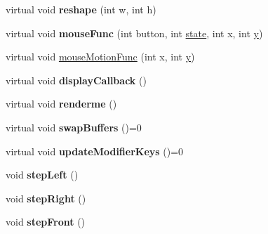 \begin{DoxyCompactItemize}
\item 
\hypertarget{class_demo_application_acbcb562288f145763585f713425da762}{virtual void {\bfseries reshape} (int w, int h)}\label{class_demo_application_acbcb562288f145763585f713425da762}

\item 
\hypertarget{class_demo_application_a634946e98868ec5463e0e906cf88119c}{virtual void {\bfseries mouse\+Func} (int button, int \hyperlink{structstate}{state}, int x, int \hyperlink{_ice_utils_8h_aa7ffaed69623192258fb8679569ff9ba}{y})}\label{class_demo_application_a634946e98868ec5463e0e906cf88119c}

\item 
virtual void \hyperlink{class_demo_application_abce282983b2ffabf0a32162f41dcbdb1}{mouse\+Motion\+Func} (int x, int \hyperlink{_ice_utils_8h_aa7ffaed69623192258fb8679569ff9ba}{y})
\item 
\hypertarget{class_demo_application_aed9cd1416f34010ba8a47c36a5ab2847}{virtual void {\bfseries display\+Callback} ()}\label{class_demo_application_aed9cd1416f34010ba8a47c36a5ab2847}

\item 
\hypertarget{class_demo_application_af496a06b814fbd6d6209b4ee4c4e6d2a}{virtual void {\bfseries renderme} ()}\label{class_demo_application_af496a06b814fbd6d6209b4ee4c4e6d2a}

\item 
\hypertarget{class_demo_application_a1ccb8cb141b6db9e5239188d4f231352}{virtual void {\bfseries swap\+Buffers} ()=0}\label{class_demo_application_a1ccb8cb141b6db9e5239188d4f231352}

\item 
\hypertarget{class_demo_application_a38b1480812b7ec428dd3ab7e8baeed65}{virtual void {\bfseries update\+Modifier\+Keys} ()=0}\label{class_demo_application_a38b1480812b7ec428dd3ab7e8baeed65}

\item 
\hypertarget{class_demo_application_a94b201e7d7aa322d0fe7165da5f13c12}{void {\bfseries step\+Left} ()}\label{class_demo_application_a94b201e7d7aa322d0fe7165da5f13c12}

\item 
\hypertarget{class_demo_application_a031801320d36bf6a417f8c2286158593}{void {\bfseries step\+Right} ()}\label{class_demo_application_a031801320d36bf6a417f8c2286158593}

\item 
\hypertarget{class_demo_application_ac0f4ed6aa537849b3fc175d88aefaeeb}{void {\bfseries step\+Front} ()}\label{class_demo_application_ac0f4ed6aa537849b3fc175d88aefaeeb}


\end{DoxyCompactItemize}

